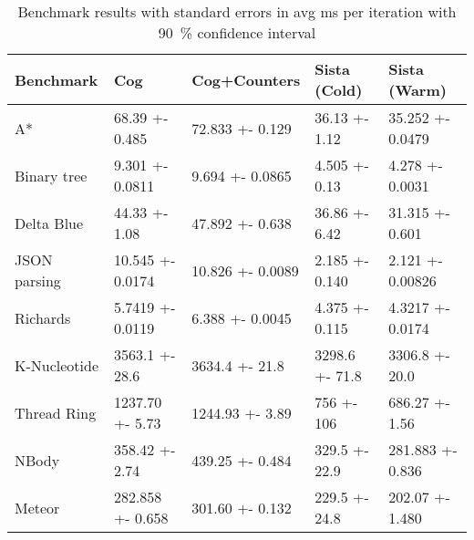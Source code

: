 \documentclass[preprint, a4paper, UKenglish]{lipics-v2016}
\begin{document}
\begin{table}
  \caption{Benchmark results with standard errors in avg ms per iteration with \SI{90}{\percent} confidence interval}
  \smaller[1]
  \centering
  \begin{tabular}{@{}lllll@{}}
    \toprule
    Benchmark & {Cog} & {Cog+Counters} & {Sista (Cold)} & {Sista (Warm)} \\
    \midrule
A* & 68.39 +- 0.485 & 72.833 +- 0.129 & 36.13 +- 1.12 & 35.252 +- 0.0479 \\
Binary tree & 9.301 +- 0.0811 & 9.694 +- 0.0865 & 4.505 +- 0.13 & 4.278 +- 0.0031 \\
Delta Blue & 44.33 +- 1.08 & 47.892 +- 0.638 & 36.86 +- 6.42 & 31.315 +- 0.601 \\
JSON parsing & 10.545 +- 0.0174 & 10.826 +- 0.0089 & 2.185 +- 0.140 & 2.121 +- 0.00826 \\
Richards & 5.7419 +- 0.0119 & 6.388 +- 0.0045 & 4.375 +- 0.115 & 4.3217 +- 0.0174 \\
K-Nucleotide & 3563.1 +- 28.6 & 3634.4 +- 21.8 & 3298.6 +- 71.8 & 3306.8 +- 20.0 \\
Thread Ring & 1237.70 +- 5.73 & 1244.93 +- 3.89 & 756 +- 106 & 686.27 +- 1.56 \\
NBody & 358.42 +- 2.74 & 439.25 +- 0.484 & 329.5 +- 22.9 & 281.883 +- 0.836 \\
Meteor & 282.858 +- 0.658 & 301.60 +- 0.132 & 229.5 +- 24.8 & 202.07 +- 1.480 \\
    \bottomrule
  \end{tabular}
  \label{tbl:benchmark}
\end{table}







%
%
\end{document}
